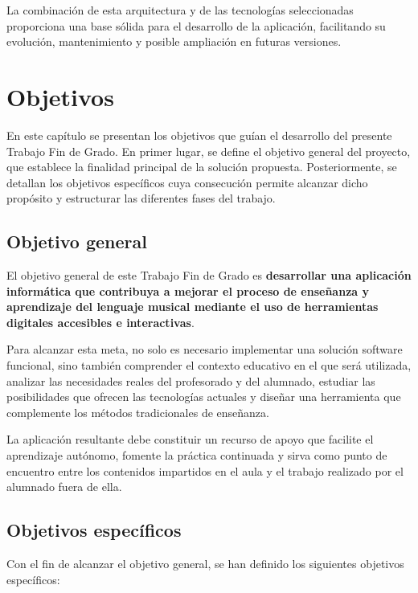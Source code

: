 La combinación de esta arquitectura y de las tecnologías seleccionadas proporciona una base sólida para el desarrollo de la aplicación, facilitando su evolución, mantenimiento y posible ampliación en futuras versiones.

\chapter{Objetivos}

En este capítulo se presentan los objetivos que guían el desarrollo del presente Trabajo Fin de Grado. En primer lugar, se define el objetivo general del proyecto, que establece la finalidad principal de la solución propuesta. Posteriormente, se detallan los objetivos específicos cuya consecución permite alcanzar dicho propósito y estructurar las diferentes fases del trabajo.

\section{Objetivo general}

El objetivo general de este Trabajo Fin de Grado es \textbf{desarrollar una aplicación informática que contribuya a mejorar el proceso de enseñanza y aprendizaje del lenguaje musical mediante el uso de herramientas digitales accesibles e interactivas}.

Para alcanzar esta meta, no solo es necesario implementar una solución software funcional, sino también comprender el contexto educativo en el que será utilizada, analizar las necesidades reales del profesorado y del alumnado, estudiar las posibilidades que ofrecen las tecnologías actuales y diseñar una herramienta que complemente los métodos tradicionales de enseñanza.

La aplicación resultante debe constituir un recurso de apoyo que facilite el aprendizaje autónomo, fomente la práctica continuada y sirva como punto de encuentro entre los contenidos impartidos en el aula y el trabajo realizado por el alumnado fuera de ella.

\section{Objetivos específicos}

Con el fin de alcanzar el objetivo general, se han definido los siguientes objetivos específicos:

